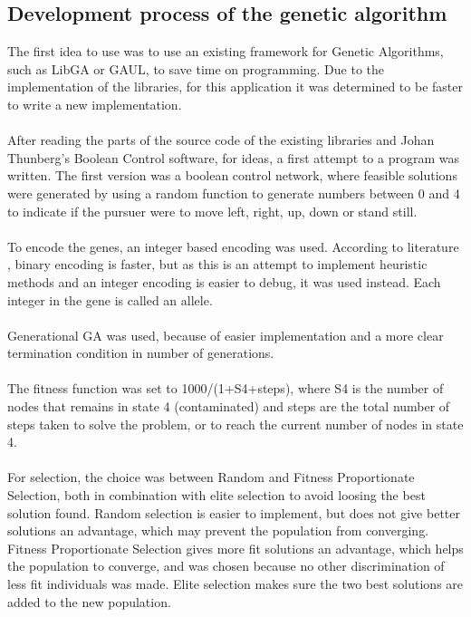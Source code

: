 \subsection{Development process of the genetic algorithm}
The first idea to use  was to use an existing framework for Genetic Algorithms, such as LibGA or GAUL, to save time on programming. Due to the implementation of the libraries, for this application it was determined to be faster to write a new implementation.\\
\\After reading the parts of the source code of the existing libraries and Johan Thunberg's Boolean Control software, for ideas, a first attempt to a program was written. The first version was a boolean control network, where feasible solutions were generated by using a random function to generate numbers between 0 and 4 to indicate if the pursuer were to move left, right, up, down or stand still.\\
\\To encode the genes, an integer based encoding was used. According to literature \cite{GAHandbook1}, binary encoding is faster, but as this is an attempt to implement heuristic methods and an integer encoding is easier to debug, it was used instead. Each integer in the gene is called an allele.\\
\\Generational GA was used, because of easier implementation and a more clear termination condition in number of generations.\\
\\The fitness function was set to 1000/(1+S4+steps), where S4 is the number of nodes that remains in state 4 (contaminated) and steps are the total number of steps taken to solve the problem, or to reach the current number of nodes in state 4.\\
\\For selection, the choice was between Random and Fitness Proportionate Selection, both in combination with elite selection to avoid loosing the best solution found. Random selection is easier to implement, but does not give better solutions an advantage, which may prevent the population from converging. Fitness Proportionate Selection gives more fit solutions an advantage, which helps the population to converge, and was chosen because no other discrimination of less fit individuals was made. Elite selection makes sure the two best solutions are added to the new population.\\
